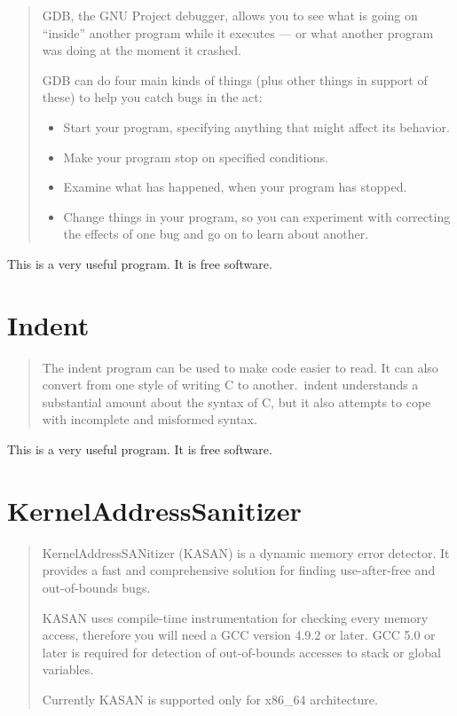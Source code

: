 \documentclass[12pt]{article}
\begin{document}
\begin{quote}
GDB, the GNU Project debugger, allows you to see what is going on
``inside'' another program while it executes --- or what another program
was doing at the moment it crashed.

GDB can do four main kinds of things (plus other things in support
of these) to help you catch bugs in the act:
\begin{itemize}
    \item Start your program, specifying anything that might affect its behavior.
    \item Make your program stop on specified conditions.
    \item Examine what has happened, when your program has stopped.
    \item Change things in your program, so you can experiment
          with correcting the effects of one bug and go on to
          learn about another.
\end{itemize}
\end{quote}

This is a very useful program. It is free software.
\cite{gdb}
\section{Indent}

\begin{quote}
The indent program can be used to make code easier to read. It
can also convert from one style of writing C to another.\ indent
understands a substantial amount about the syntax of C, but it also
attempts to cope with incomplete and misformed syntax.
\end{quote}

This is a very useful program. It is free software.
\cite{indent}
\section{KernelAddressSanitizer}
\begin{quote}
KernelAddressSANitizer (KASAN) is a dynamic memory error detector. It provides
a fast and comprehensive solution for finding use-after-free and out-of-bounds
bugs.

KASAN uses compile-time instrumentation for checking every memory access,
therefore you will need a GCC version 4.9.2 or later. GCC 5.0 or later is
required for detection of out-of-bounds accesses to stack or global variables.

Currently KASAN is supported only for x86\_64 architecture.
\end{quote}
\end{document}
